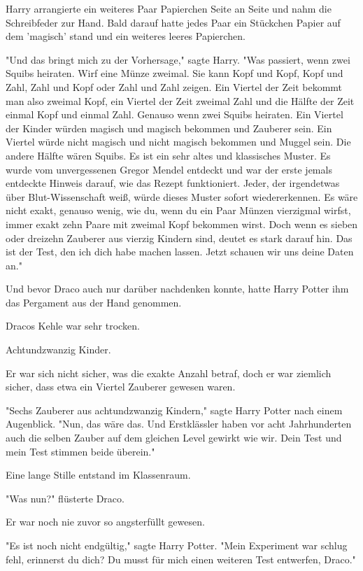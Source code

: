 {Harry arrangierte ein weiteres Paar Papierchen Seite an Seite und nahm die Schreibfeder zur Hand. Bald darauf hatte jedes Paar ein Stückchen Papier auf dem 'magisch' stand und ein weiteres leeres Papierchen.

"Und das bringt mich zu der Vorhersage," sagte Harry. "Was passiert, wenn zwei Squibs heiraten. Wirf eine Münze zweimal. Sie kann Kopf und Kopf, Kopf und Zahl, Zahl und Kopf oder Zahl und Zahl zeigen. Ein Viertel der Zeit bekommt man also zweimal Kopf, ein Viertel der Zeit zweimal Zahl und die Hälfte der Zeit einmal Kopf und einmal Zahl. Genauso wenn zwei Squibs heiraten. Ein Viertel der Kinder würden magisch und magisch bekommen und Zauberer sein. Ein Viertel würde nicht magisch und nicht magisch bekommen und Muggel sein. Die andere Hälfte wären Squibs. Es ist ein sehr altes und klassisches Muster. Es wurde vom unvergessenen Gregor Mendel entdeckt und war der erste jemals entdeckte Hinweis darauf, wie das Rezept funktioniert. Jeder, der irgendetwas über Blut-Wissenschaft weiß, würde dieses Muster sofort wiedererkennen. Es wäre nicht exakt, genauso wenig, wie du, wenn du ein Paar Münzen vierzigmal wirfst, immer exakt zehn Paare mit zweimal Kopf bekommen wirst. Doch wenn es sieben oder dreizehn Zauberer aus vierzig Kindern sind, deutet es stark darauf hin. Das ist der Test, den ich dich habe machen lassen. Jetzt schauen wir uns deine Daten an."

Und bevor Draco auch nur darüber nachdenken konnte, hatte Harry Potter ihm das Pergament aus der Hand genommen.

Dracos Kehle war sehr trocken.

Achtundzwanzig Kinder.

Er war sich nicht sicher, was die exakte Anzahl betraf, doch er war ziemlich sicher, dass etwa ein Viertel Zauberer gewesen waren.

"Sechs Zauberer aus achtundzwanzig Kindern," sagte Harry Potter nach einem Augenblick. "Nun, das wäre das. Und Erstklässler haben vor acht Jahrhunderten auch die selben Zauber auf dem gleichen Level gewirkt wie wir. Dein Test und mein Test stimmen beide überein."

Eine lange Stille entstand im Klassenraum.

"Was nun?" flüsterte Draco.

Er war noch nie zuvor so angsterfüllt gewesen.

"Es ist noch nicht endgültig," sagte Harry Potter. "Mein Experiment war schlug fehl, erinnerst du dich? Du musst für mich einen weiteren Test entwerfen, Draco."

}
